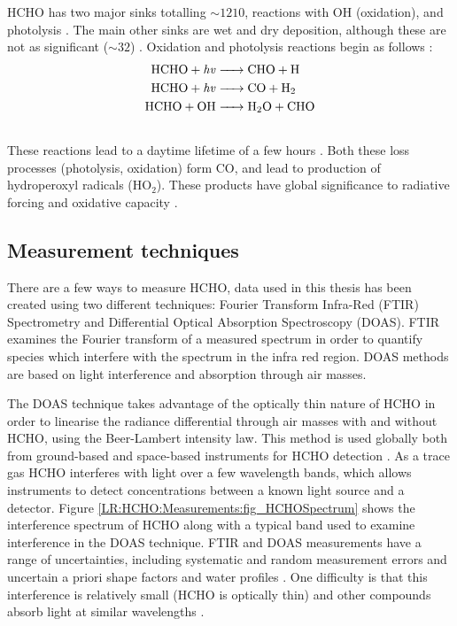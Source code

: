     HCHO has two major sinks totalling $\sim 1210$\tgpyr, reactions with OH (oxidation), and photolysis \parencite{Levy1972, Crutzen1999, Wagner2002, FortemsCheiney2012, Kefauver2014}.
    The main other sinks are wet and dry deposition, although these are not as significant ($\sim 32$\tgpyr) \parencite{Atkinson2000,FortemsCheiney2012}.
    Oxidation and photolysis reactions begin as follows \parencite{Ayers1997}:
    \begin{align*} %
      \label{Model:GC:Mechanisms:eqn_mechanisms}
        \ce{ 
          HCHO + \mathit{hv} -> & CHO + H \\ 
          HCHO + \mathit{hv} -> & CO + H2 \\ 
          HCHO + OH -> & H2O + CHO \\ 
        }
    \end{align*}
    These reactions lead to a daytime lifetime of a few hours \parencite{Atkinson2000, Millet2006}.
    Both these loss processes (photolysis, oxidation) form CO, and lead to production of hydroperoxyl radicals (HO$_2$).
    These products have global significance to radiative forcing and oxidative capacity \parencite{Franco2015}.
    
    
  \subsection{Measurement techniques}
    \label{LR:HCHO:Measurements}
    There are a few ways to measure HCHO, data used in this thesis has been created using two different techniques: Fourier Transform Infra-Red (FTIR) Spectrometry and Differential Optical Absorption Spectroscopy (DOAS).
    FTIR examines the Fourier transform of a measured spectrum in order to quantify species which interfere with the spectrum in the infra red region.
    DOAS methods are based on light interference and absorption through air masses.
    
    The DOAS technique takes advantage of the optically thin nature of HCHO in order to linearise the radiance differential through air masses with and without HCHO, using the Beer-Lambert intensity law.
    This method is used globally both from ground-based and space-based instruments for HCHO detection \parencite{Guenther1995, Abad2015, Davenport2015}.
    As a trace gas HCHO interferes with light over a few wavelength bands, which allows instruments to detect concentrations between a known light source and a detector.
    Figure \ref{LR:HCHO:Measurements:fig_HCHOSpectrum} shows the interference spectrum of HCHO along with a typical band used to examine interference in the DOAS technique.
    FTIR and DOAS measurements have a range of uncertainties, including systematic and random measurement errors and uncertain a priori shape factors and water profiles \parencite[e.g.][]{Franco2015}.
    One difficulty is that this interference is relatively small (HCHO is optically thin) and other compounds absorb light at similar wavelengths \parencite{Davenport2015}.
    
